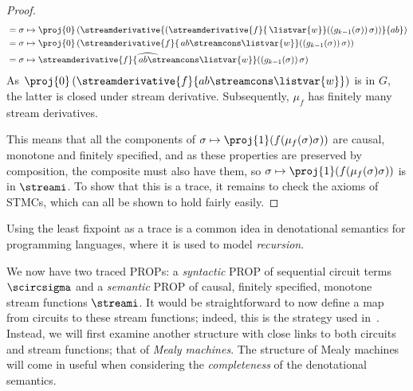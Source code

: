 \begin{proof}
\begin{align*}
         & = \sigma \mapsto \proj{0}\left(\streamderivative{\left(\streamderivative{f}{\, \listvar{w}}(\left(g_{k-1}(\sigma)\right)\sigma)\right)}{ab}\right)    \\
         & = \sigma \mapsto \proj{0}\left(\streamderivative{f}{\, ab \streamcons \listvar{w}}(\left(g_{k-1}(\sigma)\right)\sigma)\right)                         \\
         & = \sigma \mapsto \widehat{\streamderivative{f}{\, ab \streamcons \listvar{w}}}(\left(g_{k-1}(\sigma)\right)\sigma)
    \end{align*}
    As \(\proj{0}\left(\streamderivative{f}{ab \streamcons \listvar{w}}\right)\)
    is in \(G\), the latter  is closed under stream derivative.
    Subsequently, \(\mu_f\) has finitely many stream derivatives.

    This means that all the components of
    \(\sigma \mapsto \proj{1}(f(\mu_f(\sigma)\sigma))\) are causal, monotone and
    finitely specified, and as these properties are preserved by composition,
    the composite must also have them, so
    \(\sigma \mapsto \proj{1}(f(\mu_f(\sigma)\sigma))\) is in \(\streami\).
    To show that this is a trace, it remains to check the axioms of STMCs,
    which can all be shown to hold fairly easily.
\end{proof}

\begin{remark}
    Using the least fixpoint as a trace is a common idea in
    denotational semantics for programming languages, where it is used to
    model \emph{recursion}.
\end{remark}

We now have two traced PROPs: a \emph{syntactic} PROP of sequential circuit
terms \(\scircsigma\) and a \emph{semantic} PROP of causal, finitely
specified, monotone stream functions \(\streami\).
It would be straightforward to now define a map from circuits to these stream
functions; indeed, this is the strategy used in~\cite{ghica2024fully}.
Instead, we will first examine another structure with close links to both
circuits and stream functions; that of \emph{Mealy machines}.
The structure of Mealy machines will come in useful when considering the
\emph{completeness} of the denotational semantics.